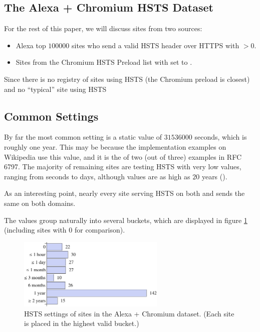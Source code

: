 \documentclass{acm_proc_article-sp}
\begin{document}
\subsection{The Alexa + Chromium HSTS Dataset}

For the rest of this paper, we will discuss sites from two sources:

\begin{itemize}
\item Alexa top $100000$ sites who send a valid HSTS header over HTTPS with {\ma}$ > 0$.
\item Sites from the Chromium HSTS Preload list with  set to .
\end{itemize}

Since there is no registry of sites using HSTS (the Chromium preload is closest) and no ``typical'' site using HSTS

\subsection{Common  Settings}

By far the most common {\ma} setting is a static value of $31536000$ seconds, which is roughly one year. This may be because the implementation examples on Wikipedia use this value\cite{wiki}, and it is the {\ma} of two (out of three) examples in RFC 6797\cite{rfc}. The majority of remaining sites are testing HSTS with very low values, ranging from seconds to days, although {\ma} values are as high as $20$ years ().

As an interesting point, nearly every site serving HSTS on both {\s} and {\sw} sends the same {\ma} on both domains.

The {\ma} values group naturally into several buckets, which are displayed in figure \ref{fig:max-age} (including sites with {\ma} $0$ for comparison).

\begin{figure}[h!]
\begin{center}
\includegraphics[width=70mm]{max-age.pdf}
\caption{HSTS  settings of sites in the Alexa + Chromium dataset. (Each site is placed in the highest valid bucket.)}
\label{fig:max-age}
\end{center}
\end{figure}
 
\end{document}
